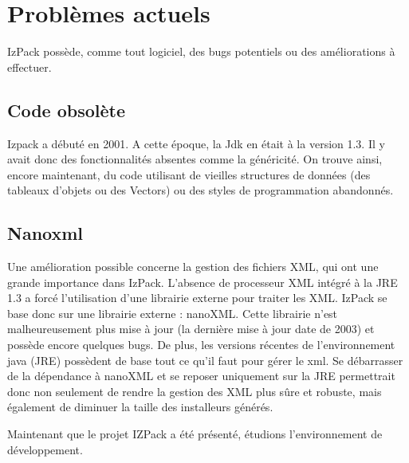 \section{Problèmes actuels}
IzPack possède, comme tout logiciel, des bugs potentiels ou des améliorations à effectuer.
\subsection{Code obsolète}
Izpack a débuté en 2001.
A cette époque, la Jdk en était à la version 1.3. Il y avait donc des fonctionnalités absentes comme la généricité.
On trouve ainsi, encore maintenant, du code utilisant de vieilles structures de données (des tableaux d'objets ou des Vectors) ou des styles de programmation abandonnés.
\subsection{Nanoxml}
Une amélioration possible concerne la gestion des fichiers XML, qui ont une grande importance dans IzPack.
L'absence de processeur XML intégré à la JRE 1.3 a forcé l'utilisation d'une librairie externe pour traiter les XML.
IzPack se base donc sur une librairie externe : nanoXML.
Cette librairie n'est malheureusement plus mise à jour (la dernière mise à jour date de 2003) et possède encore quelques bugs.
De plus, les versions récentes de l'environnement java (JRE) possèdent de base tout ce qu'il faut pour gérer le xml.
Se débarrasser de la dépendance à nanoXML et se reposer uniquement sur la JRE permettrait donc non seulement de rendre la gestion des XML plus sûre et robuste, mais également de diminuer la taille des installeurs générés.

Maintenant que le projet IZPack a été présenté, étudions l'environnement de développement.